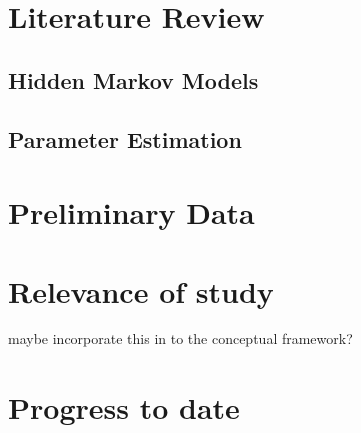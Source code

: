 \documentclass[12pt,a4paper]{article}
\author{D Maderazo}
\begin{document}
    
    \section{Literature Review}
    
        \subsection{Hidden Markov Models}
         
        
        \subsection{Parameter Estimation}
        
        
        
        
            
            
        
    \section{Preliminary Data}
    \section{Relevance of study}
        maybe incorporate this in to the conceptual framework?
        
    \section{Progress to date}
    
    

\end{document}
